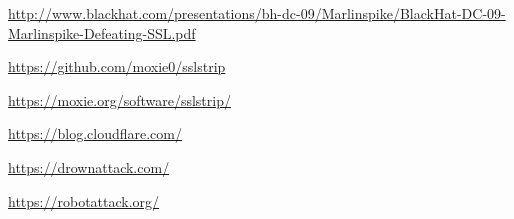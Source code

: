 \begin{thebibliography}{4}

  \url{http://www.blackhat.com/presentations/bh-dc-09/Marlinspike/BlackHat-DC-09-Marlinspike-Defeating-SSL.pdf}

  \url{https://github.com/moxie0/sslstrip}

  \url{https://moxie.org/software/sslstrip/}

  \url{https://blog.cloudflare.com/}

  \url{https://drownattack.com/}

  \url{https://robotattack.org/}

\end{thebibliography}
